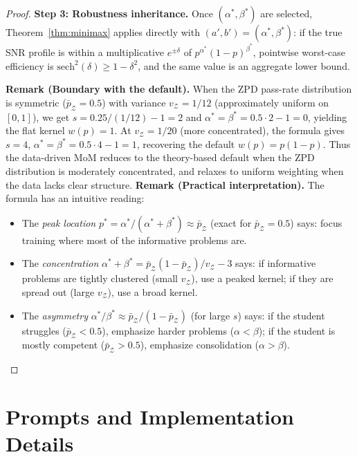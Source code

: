 \documentclass{article}
\begin{document}
\begin{proof}
\textbf{Step 3: Robustness inheritance.}
Once $(\alpha^*, \beta^*)$ are selected, Theorem~\ref{thm:minimax} applies directly with $(a', b') = (\alpha^*, \beta^*)$: if the true SNR profile is within a multiplicative $e^{\pm\delta}$ of $p^{\alpha^*}(1-p)^{\beta^*}$, pointwise worst-case efficiency is $\mathrm{sech}^2(\delta) \geq 1 - \delta^2$, and the same value is an aggregate lower bound.

\textbf{Remark (Boundary with the default).}
When the ZPD pass-rate distribution is symmetric ($\bar{p}_{\mathcal{Z}} = 0.5$) with variance $v_{\mathcal{Z}} = 1/12$ (approximately uniform on $[0,1]$), we get $s = 0.25/(1/12) - 1 = 2$ and $\alpha^* = \beta^* = 0.5 \cdot 2 - 1 = 0$, yielding the flat kernel $w(p) = 1$. At $v_{\mathcal{Z}} = 1/20$ (more concentrated), the formula gives $s=4$, $\alpha^* = \beta^* = 0.5 \cdot 4 - 1 = 1$, recovering the default $w(p) = p(1-p)$. Thus the data-driven MoM reduces to the theory-based default when the ZPD distribution is moderately concentrated, and relaxes to uniform weighting when the data lacks clear structure.
\textbf{Remark (Practical interpretation).}
The formula has an intuitive reading:
\begin{itemize}
  \item The \emph{peak location} $p^* = \alpha^*/(\alpha^*+\beta^*) \approx \bar{p}_{\mathcal{Z}}$ (exact for $\bar{p}_{\mathcal{Z}}=0.5$) says: focus training where most of the informative problems are.
  \item The \emph{concentration} $\alpha^* + \beta^* = \bar{p}_{\mathcal{Z}}(1{-}\bar{p}_{\mathcal{Z}})/v_{\mathcal{Z}} - 3$ says: if informative problems are tightly clustered (small $v_{\mathcal{Z}}$), use a peaked kernel; if they are spread out (large $v_{\mathcal{Z}}$), use a broad kernel.
  \item The \emph{asymmetry} $\alpha^*/\beta^* \approx \bar{p}_{\mathcal{Z}}/(1-\bar{p}_{\mathcal{Z}})$ (for large $s$) says: if the student struggles ($\bar{p}_{\mathcal{Z}} < 0.5$), emphasize harder problems ($\alpha < \beta$); if the student is mostly competent ($\bar{p}_{\mathcal{Z}} > 0.5$), emphasize consolidation ($\alpha > \beta$).
\end{itemize}
\end{proof}

\section{Prompts and Implementation Details}
\end{document}
